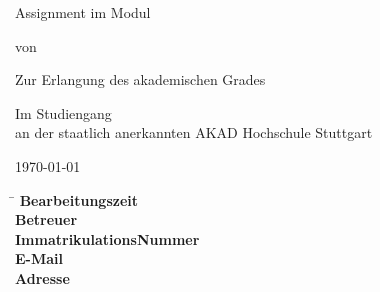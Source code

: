 \begin{titlepage}
\begin{center}
\thispagestyle{empty}

\Large{\textbf{\Title}}
\vspace{1cm}
\onehalfspacing

\large{Assignment im Modul \Module}

\vspace{1cm}
\normalsize

von

\vspace{.5cm} 
\large{\Name}
\normalsize
\vspace{1cm}

\ifassignment
\else
Zur Erlangung des akademischen Grades \\
\textbf{\Degree}
\vspace{1cm}
\fi

Im Studiengang \CourseOfStudy \\
an der staatlich anerkannten AKAD Hochschule Stuttgart
\vspace{2cm}

\today



\end{center}

\vfill
\begin{spacing}{1.2}
    \begin{tabbing}
	    \hspace{9cm}     \= \kill
	    \textbf{Bearbeitungszeit}  \>  \ProcessingTime \\
	    \textbf{Betreuer}              \>  \Supervisor \\
	    \textbf{ImmatrikulationsNummer}  \>  \RegistrationNumber \\
	    \textbf{E-Mail}		\> \href{mailto:\Email}{\Email} \\
	    \textbf{Adresse}		\> \Address \\
	    		\> \City
	\end{tabbing}
\end{spacing}
\restoregeometry
\end{titlepage}